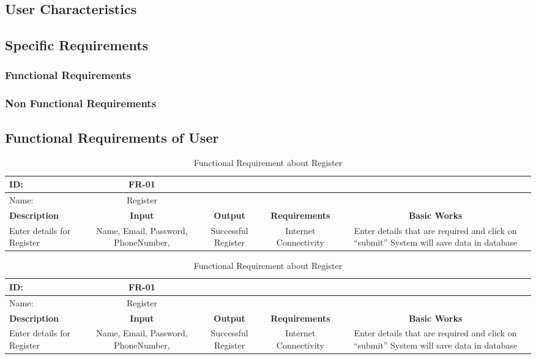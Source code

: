 \subsection{User Characteristics}
\blindtext[2]

\subsection{Specific Requirements}
    \blindtext[2]
    \subsubsection{Functional Requirements}
    \blindtext[1]
    \subsubsection{Non Functional Requirements}
    \blindtext[1]

\subsection{Functional Requirements of User}
\begin{table}[H]
\begin{tabular}{|l|c|c|c|c|}
    \hline
\bfseries ID: &\bfseries FR-01\\
\hline
Name:&Register\\
\hline
\bfseries Description&\bfseries Input&\bfseries Output &\bfseries Requirements&\bfseries Basic Works\\
\hline
Enter details for Register& Name, Email, Password, PhoneNumber, & Successful Register & Internet Connectivity&Enter details that are required and click on “submit” System will save data in database\\
\hline
\end{tabular}
\caption{Functional Requirement about Register}   

\begin{tabular}{|l|c|c|c|c|}
    \hline
\bfseries ID: &\bfseries FR-01\\
\hline
Name:&Register\\
\hline
\bfseries Description&\bfseries Input&\bfseries Output &\bfseries Requirements&\bfseries Basic Works\\
\hline
Enter details for Register& Name, Email, Password, PhoneNumber, & Successful Register & Internet Connectivity&Enter details that are required and click on “submit” System will save data in database\\
\hline
\end{tabular}
\caption{Functional Requirement about Register}   


\end{table}
